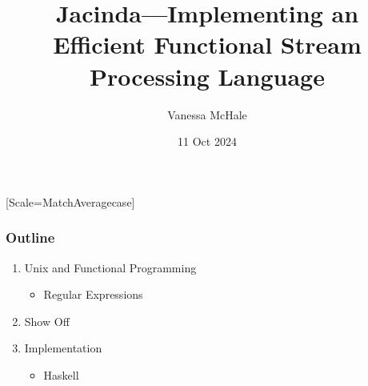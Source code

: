 \documentclass{beamer}
\begin{document}
\setmonofont{Jet Brains Mono}[Scale=MatchAveragecase]

\renewcommand{\arraystretch}{0.8}

\newcommand{\blue}[2] {\textcolor{blue}{#1}}
\newcommand{\green}[2] {\textcolor{green}{#1}}

\newcommand{\intermezzo}[1]{\title{#1}\author{}\date{}\begin{frame}\titlepage\end{frame}}
\def\nl{\crcr\noalign {\kern 3\dimen11\nointerlineskip}}
\def\bracel#1{\nl \upbracefill \nl\hfill \small{#1} \hfill\nl}

\newcommand{\textbrace}[2]{
  \begin{tabular}{c}
    \begin{tabular}{c}
      #1 \\
      \upbracefill \hfill \\
    \end{tabular} \\
    #2
  \end{tabular}
}

\title{Jacinda---Implementing an Efficient Functional Stream Processing Language}
\author{Vanessa McHale}
\date{11 Oct 2024}

\begin{frame}
\titlepage
\end{frame}

\begin{frame}
  \frametitle{Outline}
  \begin{enumerate}
    \item Unix and Functional Programming
      \begin{itemize}
        \item Regular Expressions
      \end{itemize}
    \item Show Off
    \item Implementation
      \begin{itemize}
        \item Haskell
      \end{itemize}
  \end{enumerate}
\end{frame}
\end{document}
